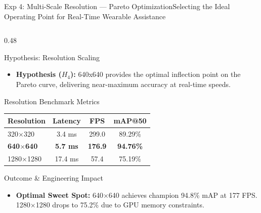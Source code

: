 \begin{frame}{Exp 4: Multi-Scale Resolution --- Pareto Optimization}{Selecting the Ideal Operating Point for Real-Time Wearable Assistance}
    \begin{columns}[c]
        \begin{column}{0.48\textwidth}
            \begin{techblock}{Hypothesis: Resolution Scaling}
                \scriptsize
                \begin{itemize}\setlength{\itemsep}{2pt}
                    \item \textbf{Hypothesis ($H_4$):} 640x640 provides the optimal inflection point on the Pareto curve, delivering near-maximum accuracy at real-time speeds.
                \end{itemize}
            \end{techblock}
            
            \vspace{0.06cm}
            \begin{card}{Resolution Benchmark Metrics}
                \centering
                \tiny
                \renewcommand{\arraystretch}{1.05}
                \begin{tabular}{l c c c}
                    \toprule
                    \textbf{Resolution} & \textbf{Latency} & \textbf{FPS} & \textbf{mAP@50} \\
                    \midrule
                    320$\times$320 & 3.4 ms & 299.0 & 89.29\% \\
                    \textbf{640$\times$640} & \textbf{5.7 ms} & \textbf{176.9} & \textbf{94.76\%} \\
                    1280$\times$1280 & 17.4 ms & 57.4 & 75.19\% \\
                    \bottomrule
                \end{tabular}
            \end{card}
            
            \vspace{0.06cm}
            \begin{alertblockcustom}{Outcome \& Engineering Impact}
                \scriptsize
                \begin{itemize}\setlength{\itemsep}{1.5pt}
                    \item \textbf{Optimal Sweet Spot:} 640$\times$640 achieves champion 94.8\% mAP at 177 FPS. 1280$\times$1280 drops to 75.2\% due to GPU memory constraints.
                \end{itemize}
            \end{alertblockcustom}
        \end{column}
        

\end{columns}
\end{frame}
